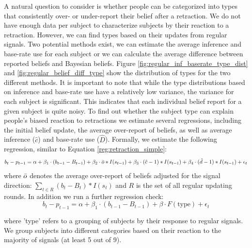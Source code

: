 \documentclass{article}
\begin{document}
A natural question to consider is whether people can be categorized into types that consistently over- or under-report their belief after a retraction. We do not have enough data per subject to characterize subjects by their reaction to a retraction. However, we can find types based on their updates from regular signals. Two potential methods exist, we can estimate the average inference and base-rate use for each subject or we can calculate the average difference between reported beliefs and Bayesian beliefs. Figure \ref{fig:regular_inf_baserate_type_dist} and \ref{fig:regular_belief_diff_type} show the distribution of types for the two different methods. It is important to note that while the type distributions based on inference and base-rate use have a relatively low variance, the variance for each subject is significant. This indicates that each individual belief report for a given subject is quite noisy. To find out whether the subject type can explain people's biased reaction to retractions we estimate several regressions, including the initial belief update, the average over-report of beliefs, as well as average inference ($\hat{c}$) and base-rate use ($\hat{D}$). Formally, we estimate the following regression, similar to Equation \ref{reg:retraction_simple}:
\begin{equation*}
    b_t-p_{t-1}=\alpha 
    + \beta_1 \cdot (b_{t-1}-B_{t-1})
    + \beta_2 \cdot \Bar{o}*I(s_{t-1})
    + \beta_3 \cdot (\hat{c}-1)*I(s_{t-1})
    + \beta_4 \cdot (\hat{d}-1)*I(s_{t-1})
    + \epsilon_t
\end{equation*} 
where $\Bar{o}$ denotes the average over-report of beliefs adjusted for the signal direction: $\sum_{t\in R}(b_t-B_t)*I(s_t)$ and $R$ is the set of all regular updating rounds. In addition we run a further regression check:
\begin{equation*}
    b_t-p_{t-1}=\alpha 
    + \beta_1 \cdot (b_{t-1}-B_{t-1})
    + \beta \cdot F(\text{type})
    + \epsilon_t
\end{equation*}

where 'type' refers to a grouping of subjects by their response to regular signals. We group subjects into different categories based on their reaction to the majority of signals (at least 5 out of 9).
\end{document}
